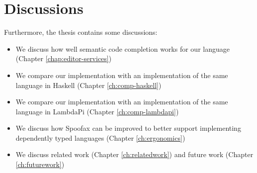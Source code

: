 \section*{Discussions}

Furthermore, the thesis contains some discussions:
\begin{itemize}
	\item We discuss how well semantic code completion works for our language (Chapter \ref{chap:editor-services})
	\item We compare our implementation with an implementation of the same language in Haskell (Chapter \ref{ch:comp-haskell})
	\item We compare our implementation with an implementation of the same language in LambdaPi (Chapter \ref{ch:comp-lambdapi})
	\item We discuss how Spoofax can be improved to better support implementing dependently typed languages (Chapter \ref{ch:ergonomics})
	\item We discuss related work (Chapter \ref{ch:relatedwork}) and future work (Chapter \ref{ch:futurework})
	
\end{itemize}
